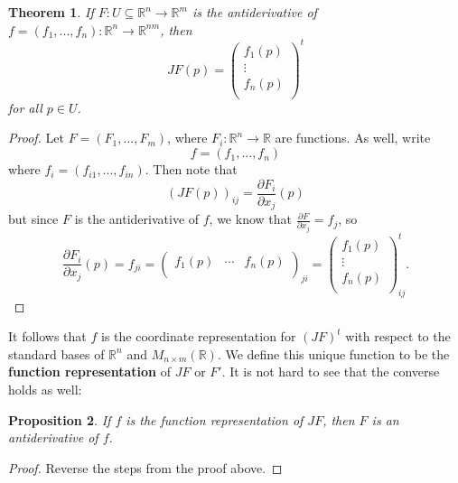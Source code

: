 \documentclass{article}
\theoremstyle{plain} %
\newtheorem{thm}{Theorem}
\numberwithin{thm}{section} %
\newtheorem{prop}[thm]{Proposition}
\theoremstyle{definition}
\begin{document}
    \begin{thm}
        If \(F: U \subseteq \mathbb{R}^n \to \mathbb{R}^m\) is the antiderivative of \(f = (f_1, ..., f_n) : \mathbb{R}^n \to \mathbb{R}^{nm}\), then 
        \[
            JF(p) = \begin{pmatrix}
                f_1(p) \\
                \vdots \\
                f_n(p) \\
            \end{pmatrix}^t
        \]
        for all \(p \in U\).
    \end{thm}
    \begin{proof}
        Let \(F = (F_1, ..., F_m)\), where \(F_i : \mathbb{R}^n \to \mathbb{R}\) are functions. As well, write
        \[
            f = (f_1, ..., f_n)
        \]
        where \(f_i = (f_{i1} , ..., f_{in})\). Then note that
        \[
            (JF(p))_{ij} = \frac{\partial F_i}{\partial x_j}(p)
        \]
        but since \(F\) is the antiderivative of \(f\), we know that \(\frac{\partial F}{\partial x_j} = f_j\), so
        \[
            \frac{\partial F_i}{\partial x_j}(p) = f_{ji} = \begin{pmatrix}
                f_1(p) & \cdots & f_n(p) \\
            \end{pmatrix}_{ji} = \begin{pmatrix}
                f_1(p) \\
                \vdots \\
                f_n(p) \\
            \end{pmatrix}^t_{ij}.
        \]
    \end{proof}
    It follows that \(f\) is the coordinate representation for \((JF)^t\) with respect to the standard bases of \(\mathbb{R}^n\) and \(M_{n\times m}(\mathbb{R})\). We define this unique function to be the \textbf{function representation} of \(JF\) or \(F'\). It is not hard to see that the converse holds as well:
    \begin{prop}
        If \(f\) is the function representation of \(JF\), then \(F\) is an antiderivative of \(f\).
    \end{prop}
    \begin{proof}
        Reverse the steps from the proof above.
    \end{proof}
    
\end{document}

